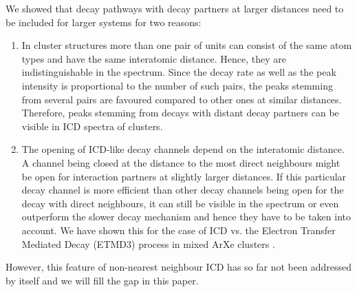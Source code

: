 We showed that decay pathways with decay partners at larger distances need to
be included for larger systems for two reasons:
\begin{enumerate}
 \item In cluster structures more than one pair of units can consist of
       the same atom types and have the same interatomic distance. Hence,
       they are indistinguishable in the spectrum. Since the decay rate
       as well as the peak intensity
       is proportional to the number of such pairs,
       the peaks stemming from several pairs are favoured
       compared to other ones at similar distances. Therefore, peaks
       stemming from decays with distant decay partners can be visible
       in ICD spectra of clusters. \cite{Fasshauer14_1}
 \item The opening of ICD-like decay channels depend on the interatomic
       distance. A channel being closed at the distance to the most direct
       neighbours might be open for interaction partners at slightly
       larger distances. If this particular decay channel is more efficient
       than other decay channels being open for the decay with direct
       neighbours, it can still be visible in the spectrum or even
       outperform the slower decay mechanism and hence they have to be
       taken into account. We have shown this for the case of ICD vs.
       the Electron Transfer Mediated Decay (ETMD3) process in mixed ArXe
       clusters \cite{Fasshauer13,Fasshauer16_1}.
\end{enumerate}
However, this feature of non-nearest neighbour ICD
has so far not been addressed by itself and we will fill the gap in this
paper.

